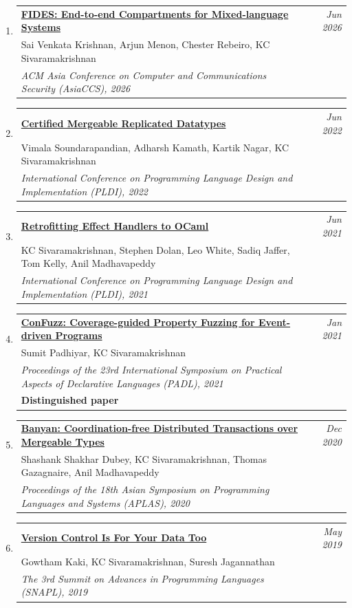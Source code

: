 \documentclass[10pt]{article}
\makeatletter
\newcommand{\lbar}[1]{{\color{#1}\ding{118}}\hspace*{2pt}}
\newenvironment{benumerate}[2]{
    \let\oldItem\item
    \def\item{\addtocounter{enumi}{-2}\oldItem}
    \begin{enumerate}[#2] \itemsep3pt
    \setcounter{enumi}{#1}
    \addtocounter{enumi}{1}}
  {\end{enumerate}}
\newenvironment{publication}[5]
{ \item
  \begin{tabular*}{7.5in}{p{6.3in}@{\extracolsep{\fill}}r}
    \href{#1}{\textbf{#2}} & \textit{#3}\\ #4 &\\ \textit{#5}&\\
  \end{tabular*}
} {}
\newenvironment{publicationNote}[6]
{ \item
  \begin{tabular*}{7.5in}{p{6.3in}@{\extracolsep{\fill}}r}
    \href{#1}{\textbf{#2}} & \textit{#3}\\ #4 &\\ \textit{#5}\\ \textbf{#6} \\
  \end{tabular*}
} {}
\newenvironment{region}[3]{%
  \Needspace{7\baselineskip}
  \vspace*{0.5ex}
  {\scalebox{1.4}{\textbf{#1}}}
  \begin{benumerate}{#3}{\color{RoyalBlue}#2}}
  {\end{benumerate}\vspace{0.8ex}}
\makeatother
\begin{document}
\begin{region} {\lbar{purple}Conference Publications}{{C}1}{18}

	\begin{publication} {https://kcsrk.info/papers/fides_asiaccs_2026.pdf}
		{FIDES: End-to-end Compartments for Mixed-language Systems}
		{Jun 2026} {Sai Venkata Krishnan, Arjun Menon, Chester Rebeiro, KC Sivaramakrishnan}
		{ACM Asia Conference on Computer and Communications Security (AsiaCCS), 2026}
  \end{publication}

	\begin{publication} {https://kcsrk.info/papers/certified_mrdt.pdf}
		{Certified Mergeable Replicated Datatypes}
		{Jun 2022} {Vimala Soundarapandian, Adharsh Kamath, Kartik Nagar, KC Sivaramakrishnan}
		{International Conference on Programming Language Design and Implementation (PLDI), 2022}
  \end{publication}

	\begin{publication} {https://kcsrk.info/papers/retro-concurrency_pldi_21.pdf}
		{Retrofitting Effect Handlers to OCaml}
		{Jun 2021} {KC Sivaramakrishnan, Stephen Dolan, Leo White, Sadiq Jaffer, Tom Kelly, Anil Madhavapeddy}
		{International Conference on Programming Language Design and Implementation (PLDI), 2021}
  \end{publication}

	\begin{publicationNote} {https://kcsrk.info/papers/confuzz_padl21.pdf}
		{ConFuzz: Coverage-guided Property Fuzzing for Event-driven Programs}
		{Jan 2021} {Sumit Padhiyar, KC Sivaramakrishnan}
		{Proceedings of the 23rd International Symposium on Practical Aspects of Declarative Languages (PADL), 2021}
    {Distinguished paper}
  \end{publicationNote}

	\begin{publication} {https://kcsrk.info/papers/banyan_aplas20.pdf}
		{Banyan: Coordination-free Distributed Transactions over Mergeable Types}
		{Dec 2020} {Shashank Shakhar Dubey, KC Sivaramakrishnan, Thomas Gazagnaire, Anil Madhavapeddy}
		{Proceedings of the 18th Asian Symposium on Programming Languages and Systems (APLAS), 2020}
  \end{publication}

	\begin{publication} {http://kcsrk.info/papers/snapl19-mrdt.pdf}
		{Version Control Is For Your Data Too}
		{May 2019} {Gowtham Kaki, KC Sivaramakrishnan, Suresh Jagannathan}
		{The 3rd Summit on Advances in Programming Languages (SNAPL), 2019}
  \end{publication}


\end{region}
\end{document}
